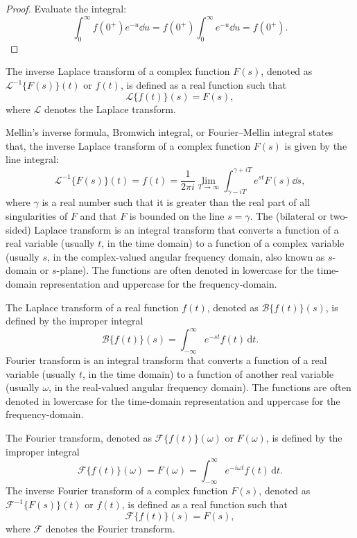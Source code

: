 \documentclass[a4paper,12pt]{report}
\begin{document}
\begin{itemize}
\begin{itemize}
\begin{proof}
Evaluate the integral:
\[\int_0^\infty f(0^+) e^{-u} \dd{u} = f(0^+) \int_0^\infty e^{-u}\dd{u} = f(0^+).\]
\end{proof}
The inverse Laplace transform of a complex function $F(s)$, denoted as $\mathcal{L}^{-1}\{F(s)\}(t)$ or $f(t)$, is defined as a real function such that
\[\mathcal{L}\{f(t)\}(s) = F(s),\]
where $\mathcal {L}$ denotes the Laplace transform.

Mellin's inverse formula, Bromwich integral, or Fourier–Mellin integral states that, the inverse Laplace transform of a complex function $F(s)$ is given by the line integral:
\[\mathcal{L}^{-1}\{F(s)\}(t)=f(t)=\frac{1}{2\pi i}\lim_{T\to\infty}\int_{\gamma-iT}^{\gamma+iT}e^{st}F(s)\dd{s},\]
where $\gamma$ is a real number such that it is greater than the real part of all singularities of $F$ and that $F$ is bounded on the line $s=\gamma$.
The (bilateral or two-sided) Laplace transform is an integral transform that converts a function of a real variable (usually $t$, in the time domain) to a function of a complex variable (usually $s$, in the complex-valued angular frequency domain, also known as $s$-domain or $s$-plane). The functions are often denoted in lowercase for the time-domain representation and uppercase for the frequency-domain.

The Laplace transform of a real function $f(t)$, denoted as $\mathcal{B}\{f(t)\}(s)$, is defined by the improper integral
\[\mathcal{B}\{f(t)\}(s) = \int_{-\infty}^{\infty} e^{-st} f(t)\,\mathrm{d}t.\]
Fourier transform is an integral transform that converts a function of a real variable (usually $t$, in the time domain) to a function of another real variable (usually $\omega$, in the real-valued angular frequency domain). The functions are often denoted in lowercase for the time-domain representation and uppercase for the frequency-domain.

The Fourier transform, denoted as $\mathcal{F}\{f(t)\}(\omega)$ or $F(\omega)$, is defined by the improper integral
\[\mathcal{F}\{f(t)\}(\omega) = F(\omega) = \int_{-\infty}^{\infty} e^{-i\omega t} f(t)\,\mathrm{d}t.\]
The inverse Fourier transform of a complex function $F(s)$, denoted as $\mathcal{F}^{-1}\{F(s)\}(t)$ or $f(t)$, is defined as a real function such that
\[\mathcal{F}\{f(t)\}(s) = F(s),\]
where $\mathcal {F}$ denotes the Fourier transform.


\end{itemize}
\end{itemize}
\end{document}

